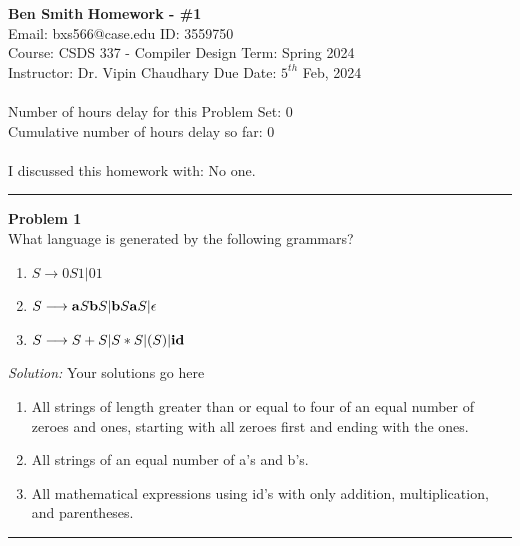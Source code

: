 \documentclass[a4paper, 11pt]{article}
\newenvironment{problem}[2][Problem]
    { \begin{mdframed}[backgroundcolor=gray!20] \textbf{#1 #2} \\}
    {  \end{mdframed}}
\newenvironment{solution}
    {\textit{Solution:}}
    {}
\begin{document}
\noindent
\large\textbf{Ben Smith} \hfill \textbf{Homework - \#1}   \\
Email: bxs566@case.edu \hfill ID: 3559750 \\
\normalsize Course: CSDS 337 - Compiler Design \hfill Term: Spring 2024\\
Instructor: Dr. Vipin Chaudhary \hfill Due Date: $5^{th}$ Feb, 2024 \\ \\
Number of hours delay for this Problem Set: \hfill 0\\
Cumulative number of hours delay so far: \hfill 0 \\ \\
I discussed this homework with: \hfill No one. \\
\noindent\rule{7in}{2.8pt}
\begin{problem}{1}
What language is generated by the following grammars?
\begin{enumerate}[a]
    \item $S \longrightarrow 0 S 1 | 0 1 $
    \item $S \longrightarrow {\bf a} S {\bf b} S | {\bf b} S {\bf a} S | \epsilon $
    \item $S \longrightarrow  S + S | S * S | (S) | {\bf id}  $
\end{enumerate}

\end{problem}
\begin{solution}
    Your solutions go here
    \begin{enumerate}[a]
        \item All strings of length greater than or equal to four of an equal number of zeroes and ones, starting with all zeroes first and ending with the ones.
        \item All strings of an equal number of a's and b's.
        \item All mathematical expressions using id's with only addition, multiplication, and parentheses.
    \end{enumerate}
\end{solution}
\noindent\rule{7in}{2.8pt}
\end{document}
